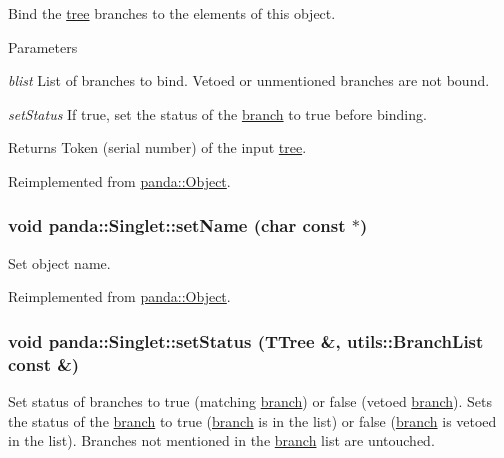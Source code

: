 Bind the \hyperlink{namespacepanda_1_1tree}{tree} branches to the elements of this object. 
\begin{DoxyParams}{Parameters}
\item[{\em blist}]List of branches to bind. Vetoed or unmentioned branches are not bound. \item[{\em setStatus}]If true, set the status of the \hyperlink{namespacepanda_1_1branch}{branch} to true before binding. \end{DoxyParams}
\begin{DoxyReturn}{Returns}
Token (serial number) of the input \hyperlink{namespacepanda_1_1tree}{tree}. 
\end{DoxyReturn}


Reimplemented from \hyperlink{classpanda_1_1Object_aed9f9d3b6abe518dd27957de843b36b5}{panda::Object}.\hypertarget{classpanda_1_1Singlet_a767d4681e6dd335e42b51d24e37b129f}{
\subsubsection[{setName}]{\setlength{\rightskip}{0pt plus 5cm}void panda::Singlet::setName (char const $\ast$)}}
\label{classpanda_1_1Singlet_a767d4681e6dd335e42b51d24e37b129f}


Set object name. 

Reimplemented from \hyperlink{classpanda_1_1Object_a7bba3813f78065be847cd8d85bab93fc}{panda::Object}.\hypertarget{classpanda_1_1Singlet_a7b38d2165f30ed45922939a806708602}{
\subsubsection[{setStatus}]{\setlength{\rightskip}{0pt plus 5cm}void panda::Singlet::setStatus (TTree \&, \/  {\bf utils::BranchList} const \&)}}
\label{classpanda_1_1Singlet_a7b38d2165f30ed45922939a806708602}


Set status of branches to true (matching \hyperlink{namespacepanda_1_1branch}{branch}) or false (vetoed \hyperlink{namespacepanda_1_1branch}{branch}). Sets the status of the \hyperlink{namespacepanda_1_1branch}{branch} to true (\hyperlink{namespacepanda_1_1branch}{branch} is in the list) or false (\hyperlink{namespacepanda_1_1branch}{branch} is vetoed in the list). Branches not mentioned in the \hyperlink{namespacepanda_1_1branch}{branch} list are untouched.


